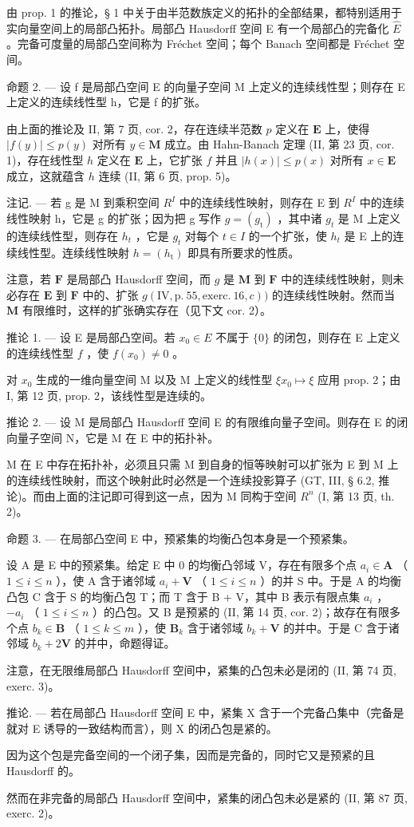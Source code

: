 由 prop. 1 的推论，§ 1 中关于由半范数族定义的拓扑的全部结果，都特别适用于实向量空间上的局部凸拓扑。局部凸 Hausdorff 空间 E 有一个局部凸的完备化 \(\hat{E}\) 。完备可度量的局部凸空间称为 Fréchet 空间；每个 Banach 空间都是 Fréchet 空间。

命题 2. --- 设 f 是局部凸空间 E 的向量子空间 M 上定义的连续线性型；则存在 E 上定义的连续线性型 h，它是 f 的扩张。

由上面的推论及 II, 第 7 页, cor. 2，存在连续半范数 \(p\) 定义在 \(\mathbf{E}\) 上，使得 \(|f(y)| \leqslant p(y)\) 对所有 \(y \in \mathbf{M}\) 成立。由 Hahn-Banach 定理 (II, 第 23 页, cor. 1)，存在线性型 \(h\) 定义在 \(\mathbf{E}\) 上，它扩张 \(f\) 并且 \(|h(x)| \leqslant p(x)\) 对所有 \(x \in \mathbf{E}\) 成立，这就蕴含 \(h\) 连续 (II, 第 6 页, prop. 5)。

注记. --- 若 g 是 M 到乘积空间 \(R^{I}\) 中的连续线性映射，则存在 E 到 \(R^{I}\) 中的连续线性映射 h，它是 g 的扩张；因为把 g 写作 \(g = (g_{\mathrm{t}})\) ，其中诸 \(g_{t}\) 是 M 上定义的连续线性型，则存在 \(h_{t}\) ，它是 \(g_{t}\) 对每个 \(t \in I\) 的一个扩张，使 \(h_{t}\) 是 E 上的连续线性型。连续线性映射 \(h = (h_{\mathrm{t}})\) 即具有所要求的性质。

注意，若 \(\mathbf{F}\) 是局部凸 Hausdorff 空间，而 \(g\) 是 \(\mathbf{M}\) 到 \(\mathbf{F}\) 中的连续线性映射，则未必存在 \(\mathbf{E}\) 到 \(\mathbf{F}\) 中的、扩张 \(g(\mathrm{IV},\mathrm{p.~55},\mathrm{exerc.~16},c))\) 的连续线性映射。然而当 \(\mathbf{M}\) 有限维时，这样的扩张确实存在（见下文 cor. 2）。

推论 1. --- 设 E 是局部凸空间。若 \(x_0 \in E\) 不属于 \(\{0\}\) 的闭包，则存在 E 上定义的连续线性型 \(f\) ，使 \(f(x_0) \neq 0\) 。

对 \(x_0\) 生成的一维向量空间 M 以及 M 上定义的线性型 \(\xi x_0 \mapsto \xi\) 应用 prop. 2；由 I, 第 12 页, prop. 2，该线性型是连续的。

推论 2. --- 设 M 是局部凸 Hausdorff 空间 E 的有限维向量子空间。则存在 E 的闭向量子空间 N，它是 M 在 E 中的拓扑补。

M 在 E 中存在拓扑补，必须且只需 M 到自身的恒等映射可以扩张为 E 到 M 上的连续线性映射，而这个映射此时必然是一个连续投影算子 (GT, III, § 6.2, 推论)。而由上面的注记即可得到这一点，因为 M 同构于空间 \(R^{n}\) (I, 第 13 页, th. 2)。

命题 3. --- 在局部凸空间 E 中，预紧集的均衡凸包本身是一个预紧集。

设 A 是 E 中的预紧集。给定 E 中 0 的均衡凸邻域 V，存在有限多个点 \(a_i \in \mathbf{A}\) （ \(1 \leqslant i \leqslant n\) ），使 A 含于诸邻域 \(a_i + \mathbf{V}\) （ \(1 \leqslant i \leqslant n\) ）的并 S 中。于是 A 的均衡凸包 C 含于 S 的均衡凸包 T；而 T 含于 B + V，其中 B 表示有限点集 \(a_i\) ， \(-a_i\) （ \(1 \leqslant i \leqslant n\) ）的凸包。又 B 是预紧的 (II, 第 14 页, cor. 2)；故存在有限多个点 \(b_k \in \mathbf{B}\) （ \(1 \leqslant k \leqslant m\) ），使 \(\mathbf{B}_k\) 含于诸邻域 \(b_k + \mathbf{V}\) 的并中。于是 C 含于诸邻域 \(b_k + 2\mathbf{V}\) 的并中，命题得证。

注意，在无限维局部凸 Hausdorff 空间中，紧集的凸包未必是闭的 (II, 第 74 页, exerc. 3)。

推论. --- 若在局部凸 Hausdorff 空间 E 中，紧集 X 含于一个完备凸集中（完备是就对 E 诱导的一致结构而言），则 X 的闭凸包是紧的。

因为这个包是完备空间的一个闭子集，因而是完备的，同时它又是预紧的且 Hausdorff 的。

然而在非完备的局部凸 Hausdorff 空间中，紧集的闭凸包未必是紧的 (II, 第 87 页, exerc. 2)。


